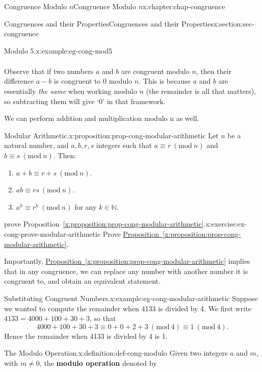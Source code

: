 \documentclass[oneside,10pt,]{book}
\newcommand{\xreffont}{\relax}
\newcommand{\terminology}[1]{\textbf{#1}}
\numberwithin{equation}{section}
\newcommand{\Mod}[1]{\ \left(\mathrm{mod}\ #1\right)}
\begin{document}
\begin{chapterptx}{Congruence Modulo \(n\)}{}{Congruence Modulo \(n\)}{}{}{x:chapter:chap-congruence}
\begin{sectionptx}{Congruences and their Properties}{}{Congruences and their Properties}{}{}{x:section:sec-congruence}
\begin{example}{Modulo 5.}{x:example:eg-cong-mod5}
\begin{align*}
\end{align*}
%
\end{example}
Observe that if two numbers \(a\) and \(b\) are congruent modulo \(n\), then their difference \(a-b\) is congruent to 0 modulo \(n\). This is because \(a\) and \(b\) are essentially \emph{the same} when working modulo \(n\) (the remainder is all that matters), so subtracting them will give `0' in that framework.%
\par
We can perform addition and multiplication modulo \textdollar{}n\textdollar{} as well.%
\begin{proposition}{Modular Arithmetic.}{}{x:proposition:prop-cong-modular-arithmetic}%
Let \(n\) be a natural number, and \(a, b, r, s\) integers such that \(a \equiv r \Mod{n}\) and \(b \equiv s \Mod{n}\). Then:%
\begin{enumerate}[label=(\alph*)]
\item{}\(a + b \equiv r + s \Mod{n}\).%
\item{}\(ab \equiv rs \Mod{n}\).%
\item{}\(a^k \equiv r^k \Mod{n}\) for any \(k \in \mathbb{N}\).%
\end{enumerate}
%
\end{proposition}
\begin{inlineexercise}{prove Proposition~{\xreffont\ref*{x:proposition:prop-cong-modular-arithmetic}}.}{x:exercise:ex-cong-prove-modular-arithmetic}%
Prove \hyperref[x:proposition:prop-cong-modular-arithmetic]{Proposition~{\xreffont\ref{x:proposition:prop-cong-modular-arithmetic}}}.%
\end{inlineexercise}
Importantly, \hyperref[x:proposition:prop-cong-modular-arithmetic]{Proposition~{\xreffont\ref{x:proposition:prop-cong-modular-arithmetic}}} implies that in any congruence, we can replace any number with another number it is congruent to, and obtain an equivalent statement.%
\begin{example}{Substituting Congruent Numbers.}{x:example:eg-cong-modular-arithmetic}%
Suppose we wanted to compute the remainder when 4133 is divided by 4. We first write \(4133 = 4000 + 100 + 30 + 3\), so that%
\begin{equation*}
4000 + 100 + 30 + 3 \equiv 0 + 0 + 2 + 3 \Mod{4} \equiv 1 \Mod{4}\text{.}
\end{equation*}
Hence the remainder when 4133 is divided by 4 is 1.%
\end{example}
\begin{definition}{The Modulo Operation.}{x:definition:def-cong-modulo}%
Given two integers \(a\) and \(m\), with \(m \ne 0\), the \terminology{modulo operation} denoted by%

\end{definition}
\end{sectionptx}
\end{chapterptx}
\end{document}
